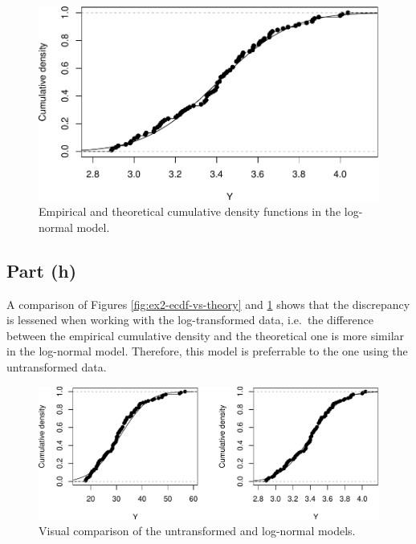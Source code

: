 \documentclass[
]{homework}
\begin{document}
\begin{figure}

{\centering \includegraphics[width=0.75\linewidth]{finalexam_files/figure-latex/ex2-log-ecdf-1} 

}

\caption{Empirical and theoretical cumulative density functions in the log-normal model.}\label{fig:ex2-log-ecdf}
\end{figure}

\subsection{Part (h)}\label{part-h}

A comparison of Figures \ref{fig:ex2-ecdf-vs-theory} and \ref{fig:ex2-log-ecdf} shows that the discrepancy is lessened when working with the log-transformed data,
i.e.~the difference between the empirical cumulative density and the theoretical one is more similar in the log-normal model. Therefore, this model is preferrable to
the one using the untransformed data.

\begin{figure}

{\centering \includegraphics[width=1\linewidth]{finalexam_files/figure-latex/ex2-cmp-normal-models-1} 

}

\caption{Visual comparison of the untransformed and log-normal models.}\label{fig:ex2-cmp-normal-models}
\end{figure}
\end{document}
